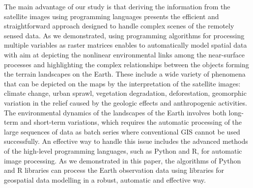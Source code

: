 \documentclass[algorithms,article,submit,pdftex,moreauthors]{Definitions/mdpi}
\begin{document}
The main advantage of our study is that deriving the information from the satellite images using programming languages presents the efficient and straightforward approach designed to handle complex scenes of the remotely sensed data. As we demonstrated, using programming algorithms for processing multiple variables as raster matrices enables to automatically model spatial data with aim at depicting the nonlinear environmental links among the near-surface processes and highlighting the complex relationships between the objects forming the terrain landscapes on the Earth. These include a wide variety of phenomena that can be depicted on the maps by the interpretation of the satellite images: climate change, urban sprawl, vegetation degradation, deforestation, geomorphic variation in the relief caused by the geologic effects and anthropogenic activities. The environmental dynamics of the landscapes of the Earth involves both long-term and short-term variations, which requires the automatic processing of the large sequences of data as batch series where conventional GIS cannot be used successfully. An effective way to handle this issue includes the advanced methods of the high-level programming languages, such as Python and R, for automatic image processing. As we demonstrated in this paper, the algorithms of Python and R libraries can process the Earth observation data using libraries for geospatial data modelling in a robust, automatic and effective way.







\end{document}
